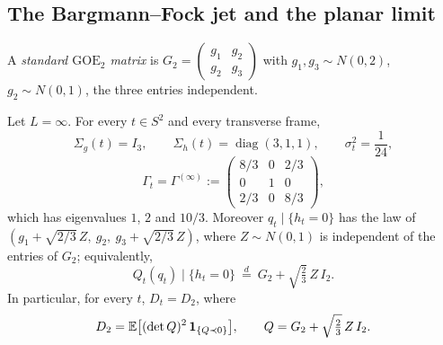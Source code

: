 \subsection{The Bargmann--Fock jet and the planar limit}\label{ssec:coefficient-planar}

A \emph{standard $\mathrm{GOE}_2$ matrix} is $G_2=\begin{pmatrix}g_1&g_2\\ g_2&g_3\end{pmatrix}$ with $g_1,g_3\sim N(0,2)$, $g_2\sim N(0,1)$, the three entries independent.

\begin{lemma}\label{lem:coefficient-planar-jet}
Let $L=\infty$. For every $t\in S^2$ and every transverse frame,
\begin{equation}\label{eq:coefficient-planar-values}
\Sigma_g(t)=I_3,\qquad \Sigma_h(t)=\operatorname{diag}(3,1,1),\qquad \sigma_t^2=\frac1{24},
\end{equation}
\begin{equation}\label{eq:coefficient-Gamma-inf}
\Gamma_t=\Gamma^{(\infty)}:=\begin{pmatrix}8/3&0&2/3\\ 0&1&0\\ 2/3&0&8/3\end{pmatrix},
\end{equation}
which has eigenvalues $1$, $2$ and $10/3$. Moreover $q_t\mid\{h_t=0\}$ has the law of $(g_1+\sqrt{2/3}\,Z,\ g_2,\ g_3+\sqrt{2/3}\,Z)$, where $Z\sim N(0,1)$ is independent of the entries of $G_2$; equivalently,
\begin{equation}\label{eq:coefficient-GOE}
Q_t(q_t)\mid\{h_t=0\}\ \stackrel{d}{=}\ G_2+\sqrt{\tfrac23}\,Z\,I_2 .
\end{equation}
In particular, for every $t$, $D_t=D_2$, where
\begin{equation}\label{eq:coefficient-D2def}
D_2=\mathbb E\bigl[(\det Q)^2\,\mathbf 1_{\{Q\prec0\}}\bigr],\qquad Q=G_2+\sqrt{\tfrac23}\,Z\,I_2 .
\end{equation}
\end{lemma}

